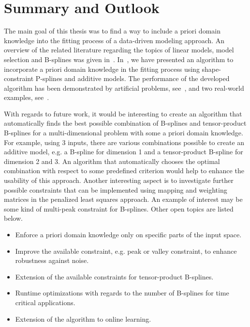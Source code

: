 \chapter{Summary and Outlook} \label{cha:summary}

The main goal of this thesis was to find a way to include a priori domain knowledge into the fitting process of a data-driven modeling approach. An overview of the related literature regarding the topics of linear models, model selection and B-splines was given in~. In~, we have presented an algorithm to incorporate a priori domain knowledge in the fitting process using shape-constraint P-splines and additive models. The performance of the developed algorithm has been demonstrated by artificial problems, see~, and two real-world examples, see~.

With regards to future work, it would be interesting to create an algorithm that automatically finds the best possible combination of B-splines and tensor-product B-splines for a multi-dimensional problem with some a priori domain knowledge. For example, using 3 inputs, there are various combinations possible to create an additive model, e.g. a B-spline for dimension 1 and a tensor-product B-spline for dimension 2 and 3. An algorithm that automatically chooses the optimal combination with respect to some predefined criterion would help to enhance the usability of this approach. Another interesting aspect is to investigate further possible constraints that can be implemented using mapping and weighting matrices in the penalized least squares approach. An example of interest may be some kind of multi-peak constraint for B-splines. Other open topics are listed below.

\begin{itemize}
	\item Enforce a priori domain knowledge only on specific parts of the input space.
	\item Improve the available constraint, e.g. peak or valley constraint, to enhance robustness against noise.
	\item Extension of the available constraints for tensor-product B-splines.
	\item Runtime optimizations with regards to the number of B-splines for time critical applications.
	\item Extension of the algorithm to online learning. 
\end{itemize}